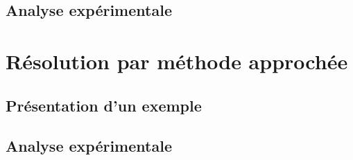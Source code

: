 




\subsection*{Analyse expérimentale}














\section{Résolution par méthode approchée}
\subsection*{Présentation d'un exemple}

\subsection*{Analyse expérimentale}








